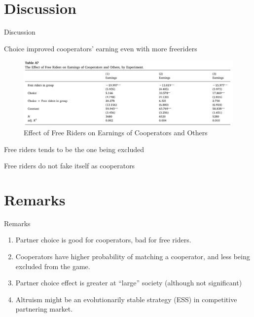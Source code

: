 \documentclass[
  10pt,
  ignorenonframetext,
  aspectratio=43,
]{beamer}
\providecommand{\tightlist}{%
  \setlength{\itemsep}{0pt}\setlength{\parskip}{0pt}}
\begin{document}
\hypertarget{discussion}{%
\section{Discussion}\label{discussion}}

\begin{frame}{Discussion}
\begin{block}{Choice improved cooperators' earning even with more
freeriders}
\protect\hypertarget{choice-improved-cooperators-earning-even-with-more-freeriders}{}
\begin{figure}
\centering
\includegraphics{20220426-serdarevic-nina-it-pays-to-be-nice.assets/Pasted image 20220424002431.png}
\caption{Effect of Free Riders on Earnings of Cooperators and Others}
\end{figure}
\end{block}
\end{frame}

\begin{frame}
\begin{block}{Free riders tends to be the one being excluded}
\protect\hypertarget{free-riders-tends-to-be-the-one-being-excluded}{}

\end{block}
\end{frame}

\begin{frame}
\begin{block}{Free riders do not fake itself as cooperators}
\protect\hypertarget{free-riders-do-not-fake-itself-as-cooperators}{}

\end{block}
\end{frame}

\hypertarget{remarks}{%
\section{Remarks}\label{remarks}}

\begin{frame}{Remarks}
\begin{enumerate}
\tightlist
\item
  Partner choice is good for cooperators, bad for free riders.
\item
  Cooperators have higher probability of matching a cooperator, and less
  being excluded from the game.
\item
  Partner choice effect is greater at ``large'' society (although not
  significant)
\item
  Altruism might be an evolutionarily stable strategy (ESS) in
  competitive partnering market.
\end{enumerate}
\end{frame}
\end{document}
